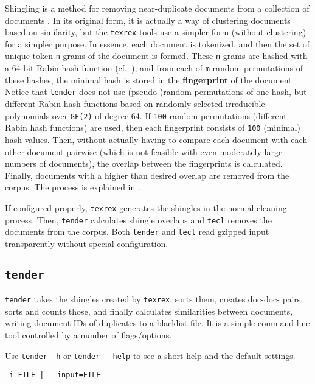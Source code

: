 \documentclass[12pt,a4paper]{article}
\newcommand{\Maro}[1]{\marginpar{\tiny\texttt{#1}}}
\begin{document}
Shingling is a method for removing near-duplicate documents from a collection of documents \citep{Broder-ea1997}.
In its original form, it is actually a way of clustering documents based on similarity, but the \texttt{texrex} tools use a simpler form (without clustering) for a simpler purpose.
In essence, each document is tokenized, and then the set of unique token-\texttt{n}-grams of the document is formed.
These \texttt{n}-grams are hashed with a 64-bit Rabin hash function (cf.\ \cite{Rabin1981}), and from each of \texttt{m} random permutations of these hashes, the minimal hash is stored in the \textbf{fingerprint} of the document.
Notice that \texttt{tender} does not use (pseudo-)random permutations of one hash, but different Rabin hash functions based on randomly selected irreducible polynomials over \texttt{GF(2)} of degree 64.
If \texttt{100} random permutations (different Rabin hash functions) are used, then each fingerprint consists of \texttt{100} (minimal) hash values.
Then, without actually having to compare each document with each other document pairwise (which is not feasible with even moderately large numbers of documents), the overlap between the fingerprints is calculated.
Finally, documents with a higher than desired overlap are removed from the corpus.
The process is explained in \cite[p.~58ff]{SchaeferBildhauer2013}.

If configured properly, \texttt{texrex} generates the shingles in the normal cleaning process.
Then, \texttt{tender} calculates shingle overlaps and \texttt{tecl} removes the documents from the corpus.
Both \texttt{tender} and \texttt{tecl} read gzipped input transparently without special configuration.

\subsection{\texttt{tender}}
\label{sec:tender}

\texttt{tender} takes the shingles created by \texttt{texrex}, sorts them, creates doc-doc- pairs, sorts and counts those, and finally calculates similarities between documents, writing document IDs of duplicates to a blacklist file.
It is a simple command line tool controlled by a number of flags\slash options.

Use \texttt{tender -h} or \texttt{tender -{-}help} to see a short help and the default settings.

\begin{center}\Maro{-i|-{-}input}
\begin{verbatim}
-i FILE | --input=FILE
\end{verbatim}
\end{center}
\end{document}
